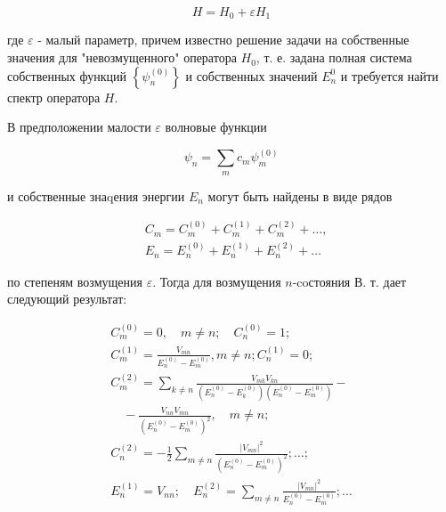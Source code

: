 \documentclass[10pt]{article}
\begin{document}
\[

H=H_{0}+\varepsilon H_{1}

\]



где $\varepsilon$ - малый параметр, причем известно решение задачи на собственные значения для "невозмущенного" оператора $H_{0}$, т. е. задана полная система собственных функций $\left\{\psi_{n}^{(0)}\right\}$ и собственных значений $E_{n}^{0}$ и требуется найти спектр оператора $H$.



В предположении малости $\varepsilon$ волновые функции



\[

\psi_{n}=\sum_{m} c_{m} \psi_{m}^{(0)}

\]



и собственные знаqения энергии $E_{n}$ могут быть найдены в виде рядов



\[

\begin{aligned}

& C_{m}=C_{m}^{(0)}+C_{m}^{(1)}+C_{m}^{(2)}+\ldots, \\

& E_{n}=E_{n}^{(0)}+E_{n}^{(1)}+E_{n}^{(2)}+\ldots

\end{aligned}

\]



по степеням возмущения $\varepsilon$. Тогда для возмущения $n$-coстояния В. т. дает следующий результат:



\[

\begin{gathered}

C_{m}^{(0)}=0, \quad m \neq n ; \quad C_{n}^{(0)}=1 ; \\

C_{m}^{(1)}=\frac{V_{m n}}{E_{n}^{(0)}-E_{m}^{(0)}}, m \neq n ; C_{n}^{(1)}=0 ; \\

C_{m}^{(2)}=\sum_{k \neq n} \frac{V_{m k} V_{k n}}{\left(E_{n}^{(0)}-E_{k}^{(0)}\right)\left(E_{n}^{(0)}-E_{m}^{(0)}\right)}- \\

\quad-\frac{V_{n n} V_{m n}}{\left(E_{n}^{(0)}-E_{m}^{(0)}\right)^{2}}, \quad m \neq n ; \\

C_{n}^{(2)}=-\frac{1}{2} \sum_{m \neq n} \frac{\left|V_{m n}\right|^{2}}{\left(E_{n}^{(0)}-E_{m}^{(0)}\right)^{2}} ; \ldots ; \\

E_{n}^{(1)}=V_{n n} ; \quad E_{n}^{(2)}=\sum_{m \neq n} \frac{\left|V_{m n}\right|^{2}}{E_{n}^{(0)}-E_{m}^{(0)}} ; \ldots

\end{gathered}

\]
\end{document}

